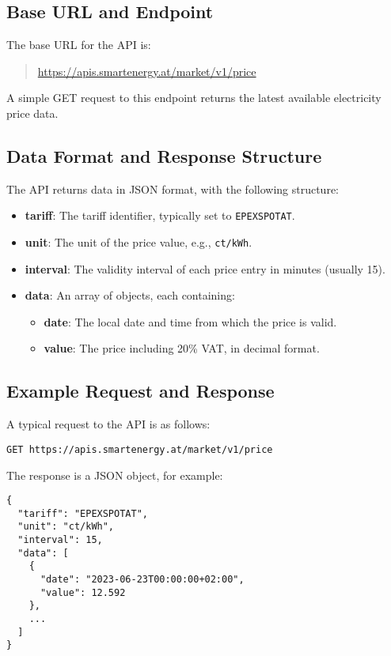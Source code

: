\subsection{Base URL and Endpoint}
The base URL for the API is:
\begin{quote}
    \url{https://apis.smartenergy.at/market/v1/price}
\end{quote}
A simple GET request to this endpoint returns the latest available electricity price data.

\subsection{Data Format and Response Structure}
The API returns data in JSON format, with the following structure:
\begin{itemize}
    \item \textbf{tariff}: The tariff identifier, typically set to \texttt{EPEXSPOTAT}.
    \item \textbf{unit}: The unit of the price value, e.g., \texttt{ct/kWh}.
    \item \textbf{interval}: The validity interval of each price entry in minutes (usually 15).
    \item \textbf{data}: An array of objects, each containing:
    \begin{itemize}
        \item \textbf{date}: The local date and time from which the price is valid.
        \item \textbf{value}: The price including 20\% VAT, in decimal format.
    \end{itemize}
\end{itemize}

\subsection{Example Request and Response}
A typical request to the API is as follows:
\begin{lstlisting}
GET https://apis.smartenergy.at/market/v1/price
\end{lstlisting}

The response is a JSON object, for example:
\begin{lstlisting}
{
  "tariff": "EPEXSPOTAT",
  "unit": "ct/kWh",
  "interval": 15,
  "data": [
    {
      "date": "2023-06-23T00:00:00+02:00",
      "value": 12.592
    },
    ...
  ]
}
\end{lstlisting}


